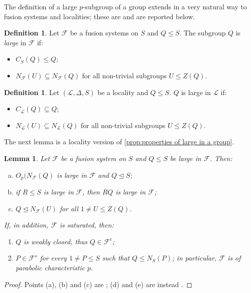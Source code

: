 \documentclass{amsart}
\numberwithin{equation}{section}
\newtheorem{lemma}[equation]{Lemma}
\theoremstyle{definition}
\newtheorem{definition}[equation]{Definition}
\theoremstyle{subresult}
\theoremstyle{caseresult}
\newcommand{\F}{\mathcal{F}}
\renewcommand{\L}{\mathcal{L}}
\newcommand{\norm}{\trianglelefteq}
\newcommand{\<}{\langle}
\renewcommand{\>}{\rangle}
\begin{document}
The definition of a large $p$-subgroup of a group extends in a very natural way to fusion systems and localities; these are \cite[Definition 1.1 and 1.2]{Henke-Salati:2026} and are reported below.

\begin{definition}
    Let $\F$ be a fusion systems on $S$ and $Q \le S$. The subgroup $Q$ is \emph{large} in $\F$ if:
    \begin{itemize}
        \item[$(SC\F)$] $C_S(Q) \le Q$;
        \item[($Q!\F)$] $N_\F(U) \subseteq N_\F(Q)$ for all non-trivial subgroups $U \le Z(Q)$.
    \end{itemize}
\end{definition}

\begin{definition}
    Let $(\L,\Delta,S)$ be a locality and $Q \le S$. $Q$ is large in $\L$ if:
    \begin{itemize}
        \item[$(SC\L)$] $C_\L(Q) \subseteq Q$;
        \item[$(Q!\L)$] $N_\L(U) \subseteq N_\L(Q)$ for all non-trivial subgroups $U \le Z(Q)$.
    \end{itemize}
\end{definition}

The next lemma is a locality version of \ref{prop:properties of large in a group}.

\begin{lemma}\label{lemma:properties of large in fus system}
    Let $\F$ be a fusion system on $S$ and $Q \le S$ be large in $\F$. Then:
    \begin{enumerate}[(a)]
      \item $O_p(N_\F(Q)$ is large in $\F$ and $Q \norm S$;
      \item if $R \le S$ is large in $\F$, then $RQ$ is large in $\F$;
      \item $Q \norm N_\F(U)$ for all $1 \ne U \le Z(Q)$.
    \end{enumerate}
    If, in addition, $\F$ is saturated, then:
    \begin{enumerate}
        \item[(d)] $Q$ is weakly closed, thus $Q \in \F^c$;
        \item[(e)] $P \in \F^s$ for every $1 \ne P \le S$ such that $Q \le N_S(P)$; in particular, $\F$ is of parabolic characteristic $p$.
    \end{enumerate}
\end{lemma}
\begin{proof}
    Points (a), (b) and (c) are \cite[Lemma 4.3]{Henke-Salati:2026}; (d) and (e) are instead \cite[Lemma 4.5]{Henke-Salati:2026}.
\end{proof}
\end{document}
